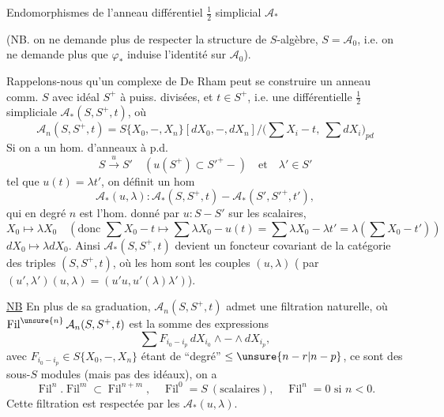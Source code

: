 Endomorphismes de l'anneau différentiel $\frac12$ simplicial $\mathcal A_*$

(NB. on ne demande plus de respecter la structure de $S$-algèbre, $S=\mathcal A_0$, i.e. on ne demande plus que $\varphi_*$ induise l'identité sur $\mathcal A_0$).

Rappelons-nous qu'un complexe de De Rham peut se construire  un anneau comm. $S$ avec idéal $S^+$ à puiss. divisées, et $t\in S^+$, i.e. une   différentielle  $\frac12$ simpliciale $\mathcal A_*(S,S^+,t)$, où
\[
\mathcal A_n(S,S^+,t)=S\{X_0,-,X_n\}[dX_0,-,dX_n]/\bigl(\sum X_i-t,\ \sum dX_i\bigr)_{pd}
\]
Si on a un hom. d'anneaux à p.d.
\[
S\xrightarrow{u}S'\quad(u(S^+)\subset S'^+-)\quad\text{et}\quad\lambda'\in S'
\]
tel que  $u(t)=\lambda t'$, on définit un hom 
\[
\mathcal A_*(u,\lambda):\mathcal A_*(S,S^+,t)-\mathcal A_*(S',S'^+,t'),
\]
qui en degré $n$ est l'hom.
donné par  $u:S-S'$ sur les scalaires,
\[
X_0\longmapsto\lambda X_0\quad\left(\text{donc }\sum X_0-t\longmapsto\sum\lambda X_0-u(t)=\sum\lambda X_0-\lambda t'=\lambda(\sum X_0-t')\right)
\]
$dX_0\longmapsto\lambda dX_0$. Ainsi $\mathcal A_*(S,S^+,t)$ devient un foncteur covariant de la catégorie des triples $(S,S^+,t)$, où les hom sont les couples $(u,\lambda)$  ( par $(u',\lambda')(u,\lambda)=(u'u,u'(\lambda)\lambda')$).

\uline{NB} En plus de sa graduation, $\mathcal A_n(S,S^+,t)$ admet une filtration  naturelle, où $\operatorname{Fil}^{\unsure{n}}\mathcal A_n(S,S^+,t)$ est la somme des expressions
\[
\sum F_{i_0- i_p}\,dX_{i_0}\wedge-\wedge dX_{i_p},
\]
avec $F_{i_0-i_p}\in S\{X_0,-,X_n\}$ étant de ``degré'' $\leq\unsure{n-r|n-p}$, ce sont des sous-$S$ modules (mais pas des idéaux), on a
\[
\operatorname{Fil}^n.\operatorname{Fil}^m\subset\operatorname{Fil}^{n+m},\quad\operatorname{Fil}^0=S\ (\text{scalaires}),\quad\operatorname{Fil}^n=0\text{ si }n<0.
\]
Cette filtration est respectée par les $\mathcal A_*(u,\lambda)$.

